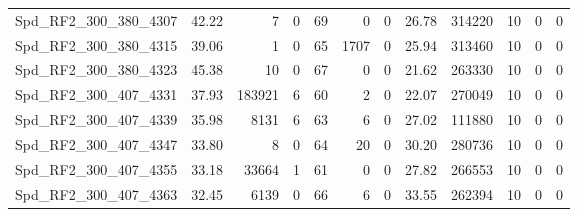 \begin{longtable}[c]{@{}lrrrrrrrrrrr@{}}
Spd\_RF2\_300\_380\_4307      & 42.22                  & 7                       & 0                       & 69                     & 0                       & 0                       & 26.78                   & 314220                   & 10                       & 0                        & 0                        \\
Spd\_RF2\_300\_380\_4315      & 39.06                  & 1                       & 0                       & 65                     & 1707                    & 0                       & 25.94                   & 313460                   & 10                       & 0                        & 0                        \\
Spd\_RF2\_300\_380\_4323      & 45.38                  & 10                      & 0                       & 67                     & 0                       & 0                       & 21.62                   & 263330                   & 10                       & 0                        & 0                        \\
Spd\_RF2\_300\_407\_4331      & 37.93                  & 183921                  & 6                       & 60                     & 2                       & 0                       & 22.07                   & 270049                   & 10                       & 0                        & 0                        \\
Spd\_RF2\_300\_407\_4339      & 35.98                  & 8131                    & 6                       & 63                     & 6                       & 0                       & 27.02                   & 111880                   & 10                       & 0                        & 0                        \\
Spd\_RF2\_300\_407\_4347      & 33.80                  & 8                       & 0                       & 64                     & 20                      & 0                       & 30.20                   & 280736                   & 10                       & 0                        & 0                        \\
Spd\_RF2\_300\_407\_4355      & 33.18                  & 33664                   & 1                       & 61                     & 0                       & 0                       & 27.82                   & 266553                   & 10                       & 0                        & 0                        \\
Spd\_RF2\_300\_407\_4363      & 32.45                  & 6139                    & 0                       & 66                     & 6                       & 0                       & 33.55                   & 262394                   & 10                       & 0                        & 0                        \\

\end{longtable}
